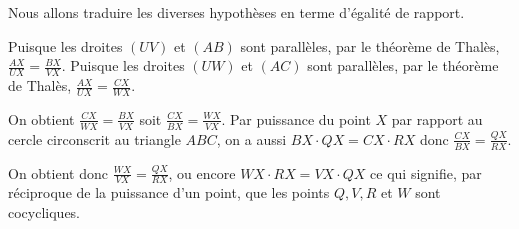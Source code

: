 \begin{sol}
\begin{center}
\end{center}

Nous allons traduire les diverses hypothèses en terme d'égalité de rapport.

Puisque les droites $(UV)$ et $(AB)$ sont parallèles, par le théorème de Thalès, $\frac{AX}{UX}=\frac{BX}{VX}$.
Puisque les droites $(UW)$ et $(AC)$ sont parallèles, par le théorème de Thalès, $\frac{AX}{UX}=\frac{CX}{WX}$.

On obtient $\frac{CX}{WX}=\frac{BX}{VX}$ soit $\frac{CX}{BX}=\frac{WX}{VX}$. Par puissance du point $X$ par rapport au cercle circonscrit au triangle $ABC$, on a aussi $BX\cdot QX=CX\cdot RX$ donc $\frac{CX}{BX}=\frac{QX}{RX}$.

On obtient donc $\frac{WX}{VX}=\frac{QX}{RX}$, ou encore $WX\cdot RX=VX\cdot QX$ ce qui signifie, par réciproque de la puissance d'un point, que les points $Q,V,R$ et $W$ sont cocycliques.

\end{sol}
